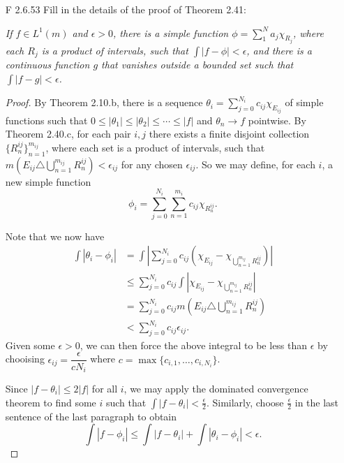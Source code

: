 \documentclass[10pt]{article}
\newcommand{\Int}{{\displaystyle \int}}
\begin{document}
\begin{enumerate}
\item[F 2.6.53] Fill in the details of the proof of Theorem 2.41:

\noindent \emph{If $f \in L^1(m)$ and $\epsilon > 0$, there is a simple function $\phi = \sum_1^N a_j \chi_{R_j}$, where each $R_j$ is a product of intervals, such that $\Int |f-\phi| < \epsilon$, and there is a continuous function $g$ that vanishes outside a bounded set such that $\Int |f-g| < \epsilon$.}

\begin{proof}

By Theorem 2.10.b, there is a sequence $\theta_i = \sum_{j=0}^{N_i} c_{ij}\chi_{E_{ij}}$ of simple functions such that $0 \leq | \theta_1| \leq |\theta_2| \leq \cdots \leq |f|$ and $\theta_n \rightarrow f$ pointwise.  By Theorem 2.40.c, for each pair $i,j$ there exists a finite disjoint collection $\{R_n^{ij}\}_{n=1}^{m_{ij}}$, where each set is a product of intervals, such that $m(E_{ij} \triangle \bigcup_{n=1}^{m_{ij}} R_n^{ij}) < \epsilon_{ij}$ for any chosen $\epsilon_{ij}$.  So we may define, for each $i$, a new simple function
$$
\phi_{i} = \sum_{j=0}^{N_i} \sum_{n=1}^{m_i} c_{ij} \chi_{R_n^{ij}}.
$$

Note that we now have
\begin{align*}
\Int |\theta_i - \phi_i| &= \Int \left| \sum_{j=0}^{N_i} c_{ij} (\chi_{E_{ij}} - \chi_{\bigcup_{n=1}^{m_{ij}}R_n^{ij}} ) \right|
\\
& \leq
\sum_{j=0}^{N_i} c_{ij} \Int \left| \chi_{E_{ij}} - \chi_{\bigcup_{n=1}^{m_{ij}}R_n^{ij}} \right|
\\
&= \sum_{j=0}^{N_i} c_{ij} m(E_{ij} \triangle \bigcup_{n=1}^{m_{ij}} R_n^{ij})
\\
&< \sum_{j=0}^{N_i} c_{ij} \epsilon_{ij}.
\end{align*}
Given some $\epsilon > 0$, we can then force the above integral to be less than $\epsilon$ by chooising $\epsilon_{ij} = \dfrac{\epsilon}{c N_i}$ where $c = \max\{c_{i,1}, \dots , c_{i,N_i}\}$.

Since $|f - \theta_i| \leq 2|f|$ for all $i$, we may apply the dominated convergence theorem to find some $i$ such that $\Int |f - \theta_i| < \frac{\epsilon}{2}$.  Similarly, choose $\frac{\epsilon}{2}$ in the last sentence of the last paragraph to obtain
$$
\Int |f - \phi_i| \leq \Int |f - \theta_i| + \Int |\theta_i - \phi_i| < \epsilon.
$$


\end{proof}
\end{enumerate}
\end{document}
